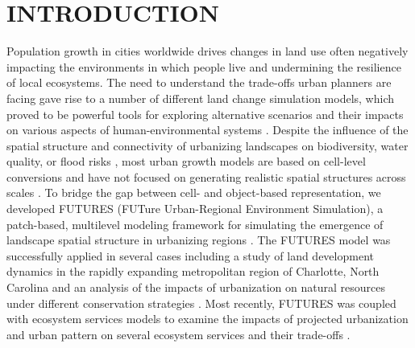 \documentclass{isprs}
\begin{document}

\maketitle


\newcommand{\normalniradky}{%
\renewcommand{\baselinestretch}{0.96}%
\selectfont%
}

\newcommand{\roztazeneradky}{%
\renewcommand{\baselinestretch}{0.98}%
\selectfont%
}
\section{INTRODUCTION}\label{INTRODUCTION}

Population growth in cities worldwide drives changes in land use
often negatively impacting the environments in which people live and undermining
the resilience of local ecosystems.
The need to understand the trade-offs urban planners are facing
gave rise to a number of different land change simulation models,
which proved to be powerful tools for exploring
alternative scenarios and their impacts on various aspects of human-environmental systems
\cite{chaudhuri2013sleuth,verburg2002modeling,sohl2007fore,waddell2002urbansim}.
Despite the influence of the spatial structure and connectivity 
of urbanizing landscapes on
biodiversity, water quality, or flood risks \cite{alberti2005effects},
most urban growth models are based on cell-level conversions and 
have not focused on generating realistic spatial structures across scales \cite{jantz2005analysis}.
To bridge the gap between cell- and object-based representation, we developed
FUTURES (FUTure Urban-Regional Environment Simulation), a patch-based, multilevel
modeling framework for simulating the emergence of landscape spatial structure
in urbanizing regions \cite{Meentemeyer2012}.
%
The FUTURES model was successfully applied in several cases 
including a study of land development dynamics in the rapidly
expanding metro\-po\-litan region of Charlotte, North Carolina \cite{Meentemeyer2012} and an analysis of the impacts
of urbanization on natural resources under different conservation strategies \cite{Dorning2015}.
Most recently, FUTURES was coupled with ecosystem services models to examine the impacts of projected urbanization and urban pattern on several
ecosystem services and their trade-offs \cite{doug2016,Brian2016}.
\end{document}
